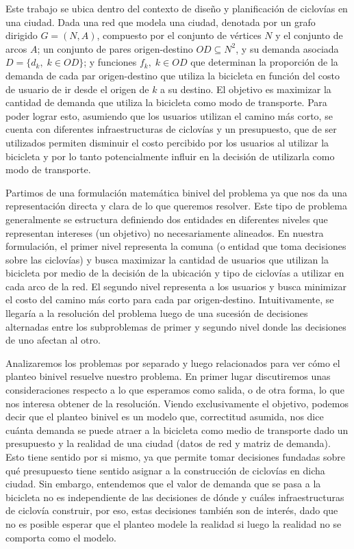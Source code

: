 \documentclass{article}
\begin{document}
  Este trabajo se ubica dentro del contexto de diseño y planificación de ciclovías en una ciudad. Dada una red que modela una ciudad, denotada por un grafo dirigido $G=(N,A)$, compuesto por el conjunto de vértices $N$ y el conjunto de arcos $A$; un conjunto de pares origen-destino $OD \subseteq N^2$, y su demanda asociada $D = \{d_k,\; k \in OD\}$; y funciones $f_k,\;k \in OD$ que determinan la proporción de la demanda de cada par origen-destino que utiliza la bicicleta en función del costo de usuario de ir desde el origen de $k$ a su destino. El objetivo es maximizar la cantidad de demanda que utiliza la bicicleta como modo de transporte. Para poder lograr esto, asumiendo que los usuarios utilizan el camino más corto, se cuenta con diferentes infraestructuras de ciclovías y un presupuesto, que de ser utilizados permiten disminuir el costo percibido por los usuarios al utilizar la bicicleta y por lo tanto potencialmente influir en la decisión de utilizarla como modo de transporte.

  Partimos de una formulación matemática binivel del problema ya que nos da una representación directa y clara de lo que queremos resolver. Este tipo de problema generalmente se estructura definiendo dos entidades en diferentes niveles que representan intereses (un objetivo) no necesariamente alineados. En nuestra formulación, el primer nivel representa la comuna (o entidad que toma decisiones sobre las ciclovías) y busca maximizar la cantidad de usuarios que utilizan la bicicleta por medio de la decisión de la ubicación y tipo de ciclovías a utilizar en cada arco de la red. El segundo nivel representa a los usuarios y busca minimizar el costo del camino más corto para cada par origen-destino. Intuitivamente, se llegaría a la resolución del problema luego de una sucesión de decisiones alternadas entre los subproblemas de primer y segundo nivel donde las decisiones de uno afectan al otro.

  Analizaremos los problemas por separado y luego relacionados para ver cómo el planteo binivel resuelve nuestro problema. En primer lugar discutiremos unas consideraciones respecto a lo que esperamos como salida, o de otra forma, lo que nos interesa obtener de la resolución. Viendo exclusivamente el objetivo, podemos decir que el planteo binivel es un modelo que, correctitud asumida, nos dice cuánta demanda se puede atraer a la bicicleta como medio de transporte dado un presupuesto y la realidad de una ciudad (datos de red y matriz de demanda). Esto tiene sentido por si mismo, ya que permite tomar decisiones fundadas sobre qué presupuesto tiene sentido asignar a la construcción de ciclovías en dicha ciudad. Sin embargo, entendemos que el valor de demanda que se pasa a la bicicleta no es independiente de las decisiones de dónde y cuáles infraestructuras de ciclovía construir, por eso, estas decisiones también son de interés, dado que no es posible esperar que el planteo modele la realidad si luego la realidad no se comporta como el modelo.
\end{document}
